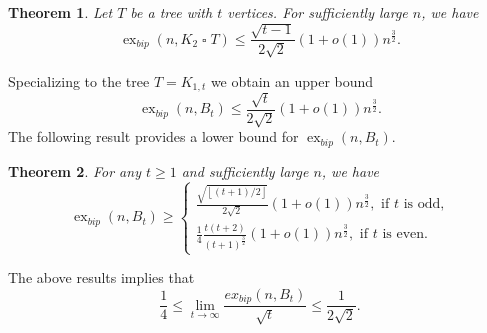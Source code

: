 \documentclass[11pt,a4paper]{article}
\newtheorem{theorem}{Theorem}[section]
\theoremstyle{definition}
\newcommand{\floor}[1]{\left\lfloor #1 \right\rfloor}
\DeclareMathOperator{\ex}{ex}
\begin{document}
        \begin{theorem}\label{thm: upper bound of K2 cross Tree}
            Let $T$ be a tree with $t$ vertices. For sufficiently large $n$, we have
            $$\ex_{bip}(n,K_2 \mathbin{\square} T)\leq \frac{\sqrt{t-1}}{2\sqrt{2}}(1+o(1)) n^{\frac{3}{2}}.$$
        \end{theorem}
        \noindent
        Specializing to the tree $T=K_{1,t}$ we obtain an upper bound 
        $$\ex_{bip}(n,B_t) \le\frac{\sqrt{t}}{2\sqrt{2}}(1+o(1))n^{\frac{3}{2}}.$$
        The following result provides a lower bound for $\ex_{bip}(n, B_t)$.

        \begin{theorem}\label{bipartite upper bound of Bt}
        For any $t\ge 1$ and sufficiently large $n$, we have
            \begin{equation*}
                \ex_{bip}(n, B_t) \geq
                \begin{cases*}
                    \frac{\sqrt{\floor{(t+1)/2}}}{2\sqrt{2}}(1 + o(1)) n^{\frac{3}{2}}, \text{ if $t$ is odd,}\\
                    \frac{1}{4} \frac{t(t+2)}{(t+1)^{\frac{3}{2}}}(1+o(1)) n^{\frac{3}{2}}, \text{ if $t$ is even}.
                \end{cases*}
            \end{equation*}
        \end{theorem}
    The above results implies that
    $$\frac{1}{4}\leq \lim_{t\to\infty}\frac{ex_{bip}(n,B_t)}{\sqrt{t}}\leq \frac{1}{2\sqrt{2}}.$$
\end{document}

